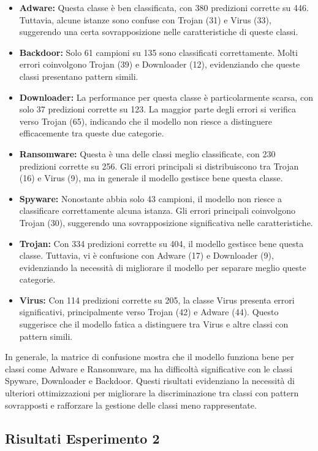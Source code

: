 \begin{itemize}
    \item \textbf{Adware:} Questa classe è ben classificata, con 380 predizioni corrette su 446. Tuttavia, alcune istanze sono confuse con Trojan (31) e Virus (33), suggerendo una certa sovrapposizione nelle caratteristiche di queste classi.
    \item \textbf{Backdoor:} Solo 61 campioni su 135 sono classificati correttamente. Molti errori coinvolgono Trojan (39) e Downloader (12), evidenziando che queste classi presentano pattern simili.
    \item \textbf{Downloader:} La performance per questa classe è particolarmente scarsa, con solo 37 predizioni corrette su 123. La maggior parte degli errori si verifica verso Trojan (65), indicando che il modello non riesce a distinguere efficacemente tra queste due categorie.
    \item \textbf{Ransomware:} Questa è una delle classi meglio classificate, con 230 predizioni corrette su 256. Gli errori principali si distribuiscono tra Trojan (16) e Virus (9), ma in generale il modello gestisce bene questa classe.
    \item \textbf{Spyware:} Nonostante abbia solo 43 campioni, il modello non riesce a classificare correttamente alcuna istanza. Gli errori principali coinvolgono Trojan (30), suggerendo una sovrapposizione significativa nelle caratteristiche.
    \item \textbf{Trojan:} Con 334 predizioni corrette su 404, il modello gestisce bene questa classe. Tuttavia, vi è confusione con Adware (17) e Downloader (9), evidenziando la necessità di migliorare il modello per separare meglio queste categorie.
    \item \textbf{Virus:} Con 114 predizioni corrette su 205, la classe Virus presenta errori significativi, principalmente verso Trojan (42) e Adware (44). Questo suggerisce che il modello fatica a distinguere tra Virus e altre classi con pattern simili.
\end{itemize}
In generale, la matrice di confusione mostra che il modello funziona bene per classi come Adware e Ransomware, ma ha difficoltà significative con le classi Spyware, Downloader e Backdoor. Questi risultati evidenziano la necessità di ulteriori ottimizzazioni per migliorare la discriminazione tra classi con pattern sovrapposti e rafforzare la gestione delle classi meno rappresentate.


\subsection{Risultati Esperimento 2}
